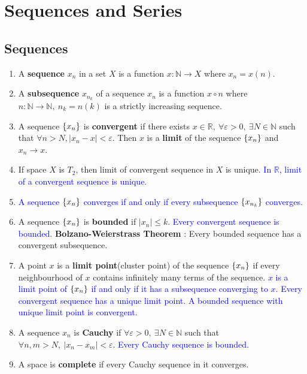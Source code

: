\chapter{Sequences and Series}
\section{Sequences}
\begin{enumerate}
	\item A \textbf{sequence} $x_n$ in a set $X$ is a function $x : \mathbb{N} \to X$ where $x_n = x(n)$.
	\item A \textbf{subsequence} $x_{n_k}$ of a sequence $x_n$ is a function $x \circ n$ where $n : \mathbb{N}\to \mathbb{N},\ n_k = n(k)$ is a strictly increasing sequence.
	\item A sequence $\{x_n\}$ is \textbf{convergent} if there exists $x \in \mathbb{R},\ \forall \varepsilon > 0,\ \exists N \in \mathbb{N}$ such that $\forall n > N, |x_n-x| < \varepsilon$.
	 Then $x$ is a \textbf{limit} of the sequence $\{x_n\}$ and $x_n \to x$.
	\item If space $X$ is $T_2$, then limit of convergent sequence in $X$ is unique.
		\subitem \textcolor{blue}{In $\mathbb{R}$, limit of a convergent sequence is unique.}
	\item \textcolor{blue}{A sequence $\{x_n\}$ converges if and only if every subsequence $\{x_{n_k}\}$ converges.}
	\item A sequence $\{x_n\}$ is \textbf{bounded} if $|x_n| \le k$.
		\subitem \textcolor{blue}{Every convergent sequence is bounded.}
		\subitem \textbf{Bolzano-Weierstrass Theorem} : Every bounded sequence has a convergent subsequence.
	\item A point $x$ is a \textbf{limit point}(cluster point) of the sequence $\{x_n\}$ if every neighbourhood of $x$ contains infinitely many terms of the sequence.
		\subitem \textcolor{blue}{$x$ is a limit point of $\{x_n\}$ if and only if it has a subsequence converging to $x$.}
		\subitem \textcolor{blue}{Every convergent sequence has a unique limit point.}
		\subitem \textcolor{blue}{A bounded sequence with unique limit point is convergent.}
	\item A sequence $x_n$ is \textbf{Cauchy} if $\forall \varepsilon > 0,\ \exists N \in \mathbb{N}$ such that $\forall n,m >N,\ |x_n-x_m| < \varepsilon$.
		\subitem \textcolor{blue}{Every Cauchy sequence is bounded.}
	\item A space is \textbf{complete} if every Cauchy sequence in it converges.

\end{enumerate}
